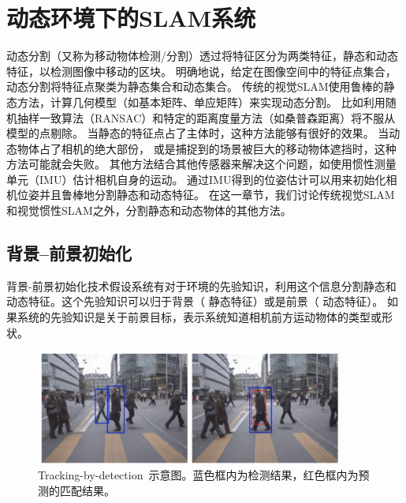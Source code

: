 \chapter{动态环境下的SLAM系统}
\label{sec:motion_segmentation}
动态分割（又称为移动物体检测/分割\cite{Derome2015Moving, Klappstein2008Moving, kundu2009movingA}）透过将特征区分为两类特征，静态和动态特征，以检测图像中移动的区块。
明确地说，给定在图像空间中的特征点集合，动态分割将特征点聚类为静态集合和动态集合。
传统的视觉SLAM使用鲁棒的静态方法，计算几何模型（如基本矩阵、单应矩阵）来实现动态分割。
比如利用随机抽样一致算法（RANSAC）\cite{fischler1981randomA}和特定的距离度量方法（如桑普森距离\cite{Hartley2008Multiple}）将不服从模型的点剔除。
当静态的特征点占了主体时，这种方法能够有很好的效果。
当动态物体占了相机的绝大部份， 或是捕捉到的场景被巨大的移动物体遮挡时，这种方法可能就会失败。
其他方法结合其他传感器来解决这个问题，如使用惯性测量单元（IMU）估计相机自身的运动\cite{Jones2011Visual, Leutenegger2014Keyframe}。
通过IMU得到的位姿估计可以用来初始化相机位姿并且鲁棒地分割静态和动态特征。
在这一章节，我们讨论传统视觉SLAM和视觉惯性SLAM之外，分割静态和动态物体的其他方法。

\section{背景--前景初始化}
背景-前景初始化技术假设系统有对于环境的先验知识，利用这个信息分割静态和动态特征。这个先验知识可以归于背景（ 静态特征）或是前景（ 动态特征）。
如果系统的先验知识是关于前景目标，表示系统知道相机前方运动物体的类型或形状。

\begin{figure}[thbp]
	\centering
	\includegraphics[width=0.9\textwidth]{figs/1-1/tbd.png}
	\caption{Tracking-by-detection~\cite{Breitenstein2010Online}示意图。蓝色框内为检测结果，红色框内为预测的匹配结果。}
	\label{fig:tracking_by_detection}
\end{figure}

